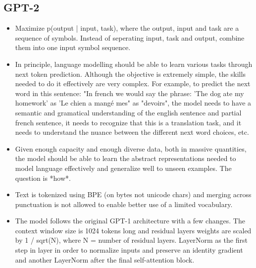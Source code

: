 \documentclass{article}
\begin{document}
\subsection{GPT-2}
\begin{itemize}
\item Maximize p(output | input, task), where the output, input and task are a sequence of symbols. Instead of seperating input, task and output, combine them into one input symbol sequence.
\item In principle, language modelling should be able to learn various tasks through next token prediction. Although the objective is extremely simple, the skills needed to do it effectively are very complex. For example, to predict the next word in this sentence: "In french we would say the phrase: 'The dog ate my homework' as 'Le chien a mangé mes" as "devoirs", the model needs to have a semantic and gramatical understanding of the english sentence and partial french sentence, it needs to recognize that this is a translation task, and it needs to understand the nuance between the different next word choices, etc.
\item Given enough capacity and enough diverse data, both in massive quantities, the model should be able to learn the abstract representations needed to model language effectively and generalize well to unseen examples. The question is *how*.
\item Text is tokenized using BPE (on bytes not unicode chars) and merging across punctuation is not allowed to enable better use of a limited vocabulary.
\item The model follows the original GPT-1 architecture with a few changes. The context window size is 1024 tokens long and residual layers weights are scaled by 1 / sqrt(N), where N = number of residual layers. LayerNorm as the first step in layer in order to normalize inputs and preserve an identity gradient and another LayerNorm after the final self-attention block.
\end{itemize}
\end{document}
